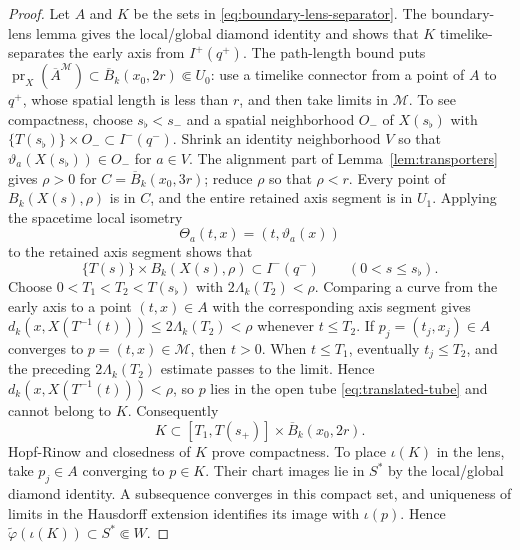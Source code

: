 \documentclass[10pt,a4paper]{article}
\numberwithin{equation}{section}
\theoremstyle{definition}
\theoremstyle{remark}
\newcommand{\cM}{\mathcal M}
\begin{document}
\begin{proof}
Let $A$ and $K$ be the sets in
\eqref{eq:boundary-lens-separator}.  The boundary-lens lemma gives the
local/global diamond identity and shows that $K$ timelike-separates the early
axis from $I^+(q^+)$.  The path-length bound puts
$\operatorname{pr}_X(\overline A^{\cM})\subset\overline B_k(x_0,2r)
\Subset U_0$: use a timelike connector from a point of $A$ to $q^+$,
whose spatial length is less than $r$, and then take limits in $\cM$.
To see compactness, choose
$s_\flat<s_-$ and a spatial neighborhood $O_-$ of $X(s_\flat)$ with
$\{T(s_\flat)\}\times O_-\subset I^-(q^-)$.  Shrink an identity neighborhood
$V$ so that $\vartheta_a(X(s_\flat))\in O_-$ for $a\in V$.  The alignment part of
Lemma~\ref{lem:transporters} gives $\rho>0$ for
$C=\overline B_k(x_0,3r)$; reduce $\rho$ so that $\rho<r$.
Every point of $B_k(X(s),\rho)$ is in $C$, and the entire retained axis
segment is in $U_1$.  Applying the spacetime local isometry
\[
 \Theta_a(t,x)=(t,\vartheta_a(x))
\]
to the retained axis segment shows that
\begin{equation}
 \{T(s)\}\times B_k(X(s),\rho)\subset I^-(q^-)
 \qquad(0<s\le s_\flat).
 \label{eq:translated-tube}
\end{equation}
Choose $0<T_1<T_2<T(s_\flat)$ with $2\Lambda_k(T_2)<\rho$.  Comparing a curve
from the early axis to a point $(t,x)\in A$ with the corresponding axis
segment gives
$d_k(x,X(T^{-1}(t)))\le2\Lambda_k(T_2)<\rho$ whenever $t\le T_2$.
If $p_j=(t_j,x_j)\in A$ converges to $p=(t,x)\in\cM$, then $t>0$.
When $t\le T_1$, eventually $t_j\le T_2$, and the preceding
$2\Lambda_k(T_2)$ estimate passes to the limit.  Hence
$d_k(x,X(T^{-1}(t)))<\rho$, so $p$ lies in the open tube
\eqref{eq:translated-tube} and cannot belong to $K$.  Consequently
\[
 K\subset[T_1,T(s_+)]\times\overline B_k(x_0,2r).
\]
Hopf-Rinow and closedness of $K$ prove compactness.  To place $\iota(K)$
in the lens, take $p_j\in A$ converging to $p\in K$.  Their chart images
lie in $S^*$ by the local/global diamond identity.  A subsequence converges
in this compact set, and uniqueness of limits in the Hausdorff extension
identifies its image with $\iota(p)$.  Hence
$\widetilde\varphi(\iota(K))\subset S^*\Subset W$.


\end{proof}
\end{document}
